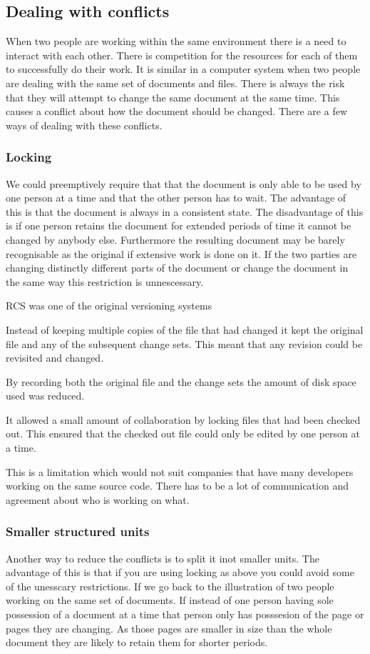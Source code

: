 \subsection{Dealing with conflicts}
When two people are working within the same environment there is a need to interact with each other.
There is competition for the resources for each of them to successfully do their work.
It is similar in a computer system when two people are dealing with the same set of documents and files.
There is always the risk that they will attempt to change the same document at the same time.
This causes a conflict about how the document should be changed.
There are a few ways of dealing with these conflicts.

\subsubsection{Locking}
We could preemptively require that that the document is only able to be used by one person at a time and that the other person has to wait. The advantage of this is that the document is always in a consistent state. The disadvantage of this is if one person retains the document for extended periods of time it cannot be changed by anybody else. Furthermore the resulting document may be barely recognisable as the original if extensive work is done on it. If the two parties are changing distinctly different parts of the document or change the document in the same way this restriction is unnescessary.


RCS was one of the original versioning systems 

Instead of keeping multiple copies of the file that had changed it kept the original file and any of the subsequent change sets.
This meant that any revision could be revisited and changed.

By recording both the original file and the change sets the amount of disk space used was reduced. 

It allowed a small amount of collaboration by locking files that had been checked out.
This ensured that the checked out file could only be edited by one person at a time.

This is a limitation which would not suit companies that have many developers working on the same source code.  
There has to be a lot of communication and agreement about who is working on what.
\subsubsection{Smaller structured units}
Another way to reduce the conflicts is to split it inot smaller units.  The advantage of this is that if you are using locking as above you could avoid some of the unesscary restrictions. If we go back to the illustration of two people working on the same set of documents.  If instead of one person having sole possession of a document at a time that person only has posssesion of the page or pages they are changing. As those pages are smaller in size than the whole document they are likely to retain them for shorter periods.
